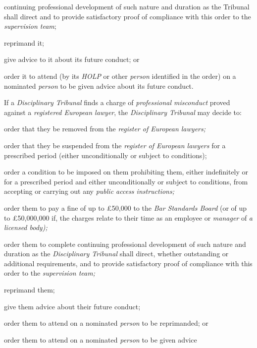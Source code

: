 continuing professional development of such nature and duration as the
Tribunal shall direct and to provide satisfactory proof of compliance
with this order to the \emph{supervision team};\item reprimand it;\item give advice to it about its future conduct; or\item order it to attend (by its \emph{HOLP} or
other \emph{person} identified in the order) on a
nominated \emph{person} to be given advice about its future conduct.\\
\par
If a \emph{Disciplinary Tribunal} finds a charge of \emph{professional
misconduct} proved against a \emph{registered European lawyer},
the \emph{Disciplinary Tribunal} may decide to:\\\nl \item order that they be removed from the \emph{register of European
lawyers;}\item order that they be suspended from the \emph{register of European
lawyers }for a prescribed period (either unconditionally or subject to
conditions);\item order a condition to be imposed on them prohibiting them, either
indefinitely or for a prescribed period and either unconditionally or
subject to conditions, from accepting or carrying out any \emph{public
access instructions;}\par
\item  order them to pay a fine of up to £50,000 to the \emph{Bar Standards
Board }(or of up to £50,000,000 if, the charges relate to their time as
an employee\emph{ }or \emph{manager }of \emph{a licensed body);}\par
\item  order them to complete continuing professional development of such
nature and duration as the \emph{Disciplinary Tribunal }shall direct,
whether outstanding or additional requirements, and to provide
satisfactory proof of compliance with this order to
the \emph{supervision team;}\par
\item  reprimand them;\item give them advice about their future conduct;\item order them to attend on a nominated \emph{person }to be reprimanded;
or\item order them to attend on a nominated \emph{person }to be given advice
